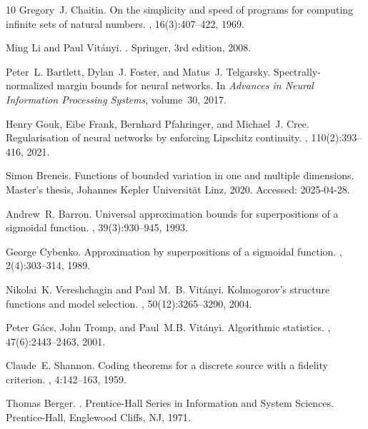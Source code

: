 \documentclass[11pt,letter,leqno]{article}
\begin{document}
\begin{thebibliography}{10}
Gregory~J. Chaitin.
\newblock On the simplicity and speed of programs for computing infinite sets
  of natural numbers.
, 16(3):407--422, 1969.

Ming Li and Paul Vit{\'a}nyi.
.
\newblock Springer, 3rd edition, 2008.

Peter~L. Bartlett, Dylan~J. Foster, and Matus~J. Telgarsky.
\newblock Spectrally-normalized margin bounds for neural networks.
\newblock In {\em Advances in Neural Information Processing Systems},
  volume~30, 2017.

Henry Gouk, Eibe Frank, Bernhard Pfahringer, and Michael~J. Cree.
\newblock Regularisation of neural networks by enforcing {L}ipschitz
  continuity.
, 110(2):393--416, 2021.

Simon Breneis.
\newblock Functions of bounded variation in one and multiple dimensions.
\newblock Master's thesis, Johannes Kepler Universität Linz, 2020.
\newblock Accessed: 2025-04-28.

Andrew~R. Barron.
\newblock Universal approximation bounds for superpositions of a sigmoidal
  function.
, 39(3):930--945, 1993.

George Cybenko.
\newblock Approximation by superpositions of a sigmoidal function.
, 2(4):303--314,
  1989.

Nikolai~K. Vereshchagin and Paul M.~B. Vit{\'a}nyi.
\newblock Kolmogorov's structure functions and model selection.
, 50(12):3265--3290,
  2004.

Peter G\'acs, John Tromp, and Paul~M.B. Vit\'anyi.
\newblock Algorithmic statistics.
, 47(6):2443--2463,
  2001.

Claude~E. Shannon.
\newblock Coding theorems for a discrete source with a fidelity criterion.
, 4:142--163, 1959.

Thomas Berger.
.
\newblock Prentice-Hall Series in Information and System Sciences.
  Prentice-Hall, Englewood Cliffs, NJ, 1971.


\end{thebibliography}
\end{document}
